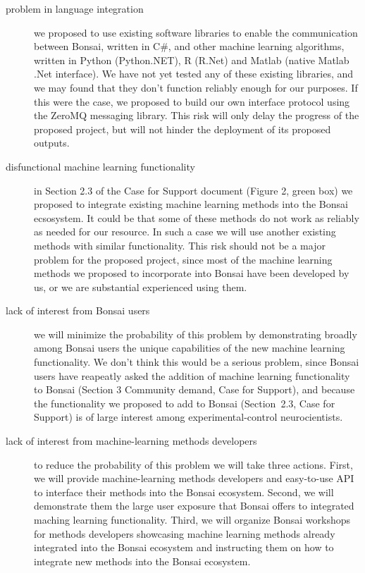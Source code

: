 \documentclass[a4paper,11pt]{article}
\begin{document}
\begin{description}

    \item[problem in language integration] we proposed to use existing software
        libraries to enable the communication between Bonsai, written in C\#,
        and other machine learning algorithms, written in Python (Python.NET),
        R (R.Net) and Matlab (native Matlab .Net interface). We have not yet
        tested any of these existing libraries, and we may found that they
        don't function reliably enough for our purposes. If this were the case,
        we proposed to build our own interface protocol using the ZeroMQ
        messaging library.  This risk will only delay the progress of the
        proposed project, but will not hinder the deployment of its proposed
        outputs.

    \item[disfunctional machine learning functionality] in Section 2.3 of the
        Case for Support document (Figure 2, green box) we proposed to
        integrate existing machine learning methods into the Bonsai ecsosystem.
        It could be that some of these methods do not work as reliably as
        needed for our resource. In such a case we will use another existing
        methods with similar functionality.  This risk should not be a major
        problem for the proposed project, since most of the machine learning
        methods we proposed to incorporate into Bonsai have been
        developed by us, or we are substantial experienced using them.

    \item[lack of interest from Bonsai users] we will minimize the probability
        of this problem by demonstrating broadly among Bonsai users the unique
        capabilities of the new machine learning functionality.  We don't think
        this would be a serious problem, since Bonsai users have reapeatly
        asked the addition of machine learning functionality to Bonsai (Section
        3 Community demand, Case for Support), and because the functionality we
        proposed to add to Bonsai (Section~2.3, Case for Support) is of large
        interest among experimental-control neurocientists.

    \item[lack of interest from machine-learning methods developers] to reduce
        the probability of this problem we will take three actions. First, we
        will provide machine-learning methods developers and easy-to-use API to
        interface their methods into the Bonsai ecosystem. Second, we will
        demonstrate them the large user exposure that Bonsai offers to
        integrated maching learning functionality. Third, we will organize
        Bonsai workshops for methods developers showcasing machine learning
        methods already integrated into the Bonsai ecosystem and instructing
        them on how to integrate new methods into the Bonsai ecosystem.

    \end{description}
\end{document}
